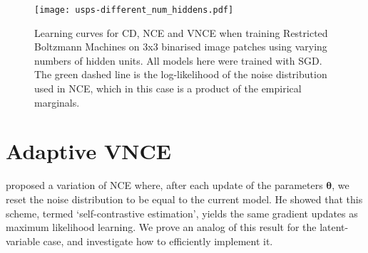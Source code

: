 \documentclass[11pt, oneside]{article}
\newcommand{\thetab}{{\boldsymbol{\theta}}}
\theoremstyle{definition}
\begin{document}
{\begin{figure}[ht]
\vspace{-5mm}
  \centering
  \texttt{[image: usps-different\_num\_hiddens.pdf]}
  \vspace{-5mm}
    \caption{Learning curves for CD, NCE and VNCE when training Restricted Boltzmann Machines on 3x3 binarised image patches using varying numbers of hidden units. All models here were trained with SGD. The green dashed line is the log-likelihood of the noise distribution used in NCE, which in this case is a product of the empirical marginals.}
    \label{fig:usps-rbm}
\end{figure}


\newpage
\section{Adaptive VNCE}
\citet{goodfellow2014distinguishability} proposed a variation of NCE where, after each update of the parameters $\thetab$, we reset the noise distribution to be equal to the current model. He showed that this scheme, termed `self-contrastive estimation', yields the same gradient updates as maximum likelihood learning. We prove an analog of this result for the latent-variable case, and investigate how to efficiently implement it.

}
\end{document}
